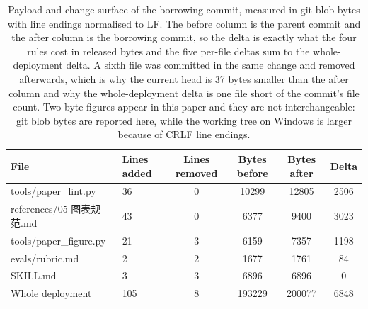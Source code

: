 \begin{table}[t]
\centering
\caption{Payload and change surface of the borrowing commit, measured in git blob bytes with line endings normalised to LF. The before column is the parent commit and the after column is the borrowing commit, so the delta is exactly what the four rules cost in released bytes and the five per-file deltas sum to the whole-deployment delta. A sixth file was committed in the same change and removed afterwards, which is why the current head is 37 bytes smaller than the after column and why the whole-deployment delta is one file short of the commit's file count. Two byte figures appear in this paper and they are not interchangeable: git blob bytes are reported here, while the working tree on Windows is larger because of CRLF line endings.}
\label{tab:tab-payload}
\begin{tabular}{llcccc}
\toprule
\textbf{File} & \textbf{Lines added} & \textbf{Lines removed} & \textbf{Bytes before} & \textbf{Bytes after} & \textbf{Delta} \\
\midrule
tools/paper_lint.py & 36 & 0 & 10299 & 12805 & 2506 \\
references/05-图表规范.md & 43 & 0 & 6377 & 9400 & 3023 \\
tools/paper_figure.py & 21 & 3 & 6159 & 7357 & 1198 \\
evals/rubric.md & 2 & 2 & 1677 & 1761 & 84 \\
SKILL.md & 3 & 3 & 6896 & 6896 & 0 \\
Whole deployment & 105 & 8 & 193229 & 200077 & 6848 \\
\bottomrule
\end{tabular}
\end{table}
